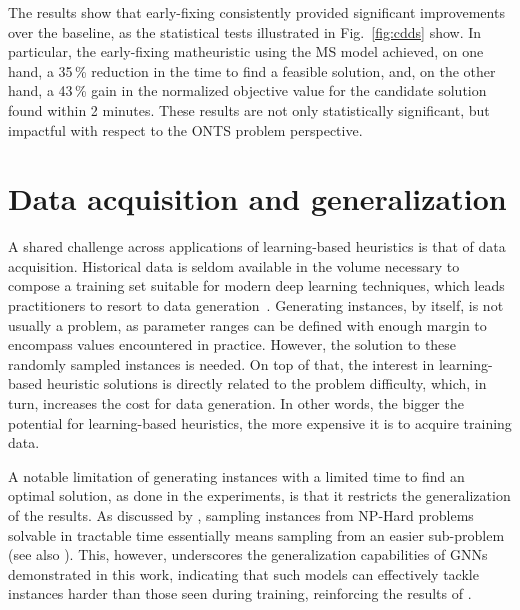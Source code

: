 The results show that early-fixing consistently provided significant improvements over the baseline, as the statistical tests illustrated in Fig.~\ref{fig:cdds} show.
In particular, the early-fixing matheuristic using the MS model achieved, on one hand, a 35\,\% reduction in the time to find a feasible solution, and, on the other hand, a 43\,\% gain in the normalized objective value for the candidate solution found within 2 minutes.
These results are not only statistically significant, but impactful with respect to the ONTS problem perspective.

\section{Data acquisition and generalization}

A shared challenge across applications of learning-based heuristics is that of data acquisition.
Historical data is seldom available in the volume necessary to compose a training set suitable for modern deep learning techniques, which leads practitioners to resort to data generation~\cite{bengioMachineLearningCombinatorial2021}.
Generating instances, by itself, is not usually a problem, as parameter ranges can be defined with enough margin to encompass values encountered in practice.
However, the solution to these randomly sampled instances is needed.
On top of that, the interest in learning-based heuristic solutions is directly related to the problem difficulty, which, in turn, increases the cost for data generation.
In other words, the bigger the potential for learning-based heuristics, the more expensive it is to acquire training data.

A notable limitation of generating instances with a limited time to find an optimal solution, as done in the experiments, is that it restricts the generalization of the results.
As discussed by , sampling instances from NP-Hard problems solvable in tractable time essentially means sampling from an easier sub-problem (see also ).
This, however, underscores the generalization capabilities of GNNs demonstrated in this work, indicating that such models can effectively tackle instances harder than those seen during training, reinforcing the results of .

